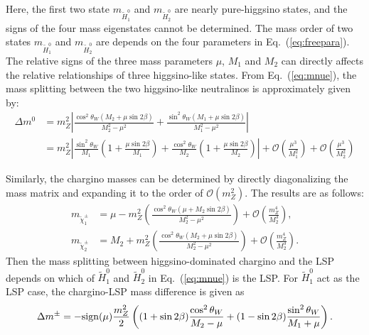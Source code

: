 \documentclass[letterpaper,11pt]{article}
\begin{document}
Here, the first two state $m_{\tilde{H}_1^0}$ and $m_{\tilde{H}_2^0}$ are nearly pure-higgsino states, and the signs of the four mass eigenstates cannot be determined. The mass order of two states $m_{\tilde{H}_1^0}$ and $m_{\tilde{H}_2^0}$ are depends on the four parameters in Eq.~(\ref{eq:freepara}). The relative signs of the three mass parameters $\mu$, $M_1$ and $M_2$ can directly affects the relative relationships of three higgsino-like states. 
From Eq.~(\ref{eq:mnue}), the mass splitting between the two higgsino-like neutralinos is approximately given by:  
\begin{equation}\label{eq:msplitn2n1}
\begin{split}
\Delta m^0 
&= m_Z^2 \left| \frac{\cos^2{{\theta_W}}(M_2 + \mu \sin{2\beta})}{M_2^2 - \mu^2} + \frac{\sin^2{{\theta_W}}( M_1 + \mu \sin{2\beta})}{M_1^2 - \mu^2 } \right| \\
&= m_Z^2 \left| \frac{\sin^2{\theta_W}}{M_1} \left( 1 + \frac{\mu \sin{2\beta}}{M_1} \right) + \frac{\cos^2{\theta_W}}{M_2} \left( 1 + \frac{\mu \sin{2\beta}}{M_2} \right) \right| 
+ \mathcal{O}\left( \frac{\mu^3}{M_1^2} \right) + \mathcal{O}\left( \frac{\mu^3}{M_2^2} \right)
\end{split}
\end{equation}
\par Similarly, the chargino masses can be determined by directly diagonalizing the mass matrix and expanding it to the order of $\mathcal{O}(m_Z^2)$. The results are as follows: 
\begin{equation}\begin{split}
	m_{\tilde{\chi}_1^\pm} &=  \mu  
		- m_Z^2 \left( \frac{\cos^2{\theta_W} (\mu + M_2 \sin{2\beta})}{M_2^2 - \mu^2 } \right) 
        + \mathcal{O} (\frac{m_Z^4}{M_2^3}),
        \\
	m_{\tilde{\chi}_2^\pm} &=  M_2  
		+ m_Z^2 \left( \frac{\cos^2{\theta_W} (M_2 + \mu \sin{2\beta})}{M_2^2 - \mu^2 } \right) 
       + \mathcal{O} (\frac{m_Z^4}{M_2^3}).
\end{split}
\end{equation}
Then the mass splitting between higgsino-dominated chargino and the LSP depends on which of $\tilde{H}_1^0$ and $\tilde{H}_2^0$ in Eq.~(\ref{eq:mnue}) is the LSP. For $\tilde{H}_1^0$ act as the LSP case, the chargino-LSP mass difference is given as 
\begin{equation}\label{eq:msplitc1H1}
	\Delta m^\pm  = -{\rm sign}(\mu) \frac{m_Z^2}{2} \left(
	(1 + \sin{2\beta}) 
	\frac{ \cos^2{\theta_W}}{M_2 - \mu }  
	 + (1-\sin{2\beta}) \frac{ \sin^2{\theta_W}}{M_1 + \mu} \right). 
\end{equation}
\end{document}
